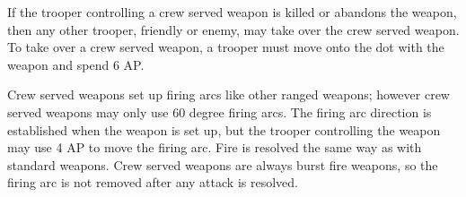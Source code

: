 If the trooper controlling a crew served weapon is killed or abandons the weapon, then any other trooper, friendly or enemy, may take over the crew served weapon.
To take over a crew served weapon, a trooper must move onto the dot with the weapon and spend 6 AP.

Crew served weapons set up firing arcs like other ranged weapons; however crew served weapons may only use 60 degree firing arcs.
The firing arc direction is established when the weapon is set up, but the trooper controlling the weapon may use 4 AP to move the firing arc.
Fire is resolved the same way as with standard weapons.
Crew served weapons are always burst fire weapons, so the firing arc is not removed after any attack is resolved.
